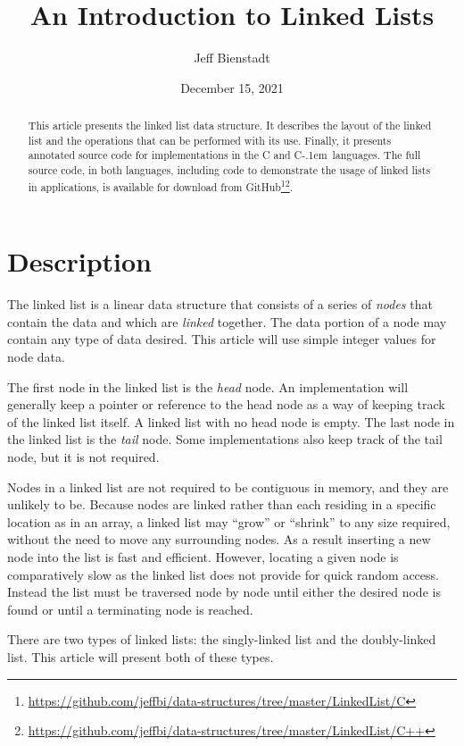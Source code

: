 \documentclass{article}
\newcommand{\Cpp}{\mbox{C\kern-.1em\raisebox{.35ex}{\smaller{\smaller{+\kern-0.05em+}}}}}
\begin{document}
  \title{An Introduction to Linked Lists}
  \author{Jeff Bienstadt}
  \date{December 15, 2021}
  \maketitle
  \begin{abstract}
    This article presents the linked list data structure. It describes the layout of the linked list and the operations that can be performed with its use. Finally, it presents annotated source code for implementations in the C and \Cpp\ languages. The full source code, in both languages, including code to demonstrate the usage of linked lists in applications, is available for download from GitHub\footnote{\url{https://github.com/jeffbi/data-structures/tree/master/LinkedList/C}}\footnote{\url{https://github.com/jeffbi/data-structures/tree/master/LinkedList/C++}}.
  \end{abstract}
  \part{Description}\label{part:description}
  The linked list is a linear data structure that consists of a series of \emph{nodes} that contain the data and which are \emph{linked} together. The data portion of a node may contain any type of data desired. This article will use simple integer values for node data.

  The first node in the linked list is the \emph{head} node. An implementation will generally keep a pointer or reference to the head node as a way of keeping track of the linked list itself. A linked list with no head node is empty. The last node in the linked list is the \emph{tail} node. Some implementations also keep track of the tail node, but it is not required.

  Nodes in a linked list are not required to be contiguous in memory, and they are unlikely to be. Because nodes are linked rather than each residing in a specific location as in an array, a linked list may ``grow'' or ``shrink'' to any size required, without the need to move any surrounding nodes. As a result inserting a new node into the list is fast and efficient. However, locating a given node is comparatively slow as the linked list does not provide for quick random access. Instead the list must be traversed node by node until either the desired node is found or until a terminating node is reached.

  There are two types of linked lists: the singly-linked list and the doubly-linked list. This article will present both of these types.
\end{document}
